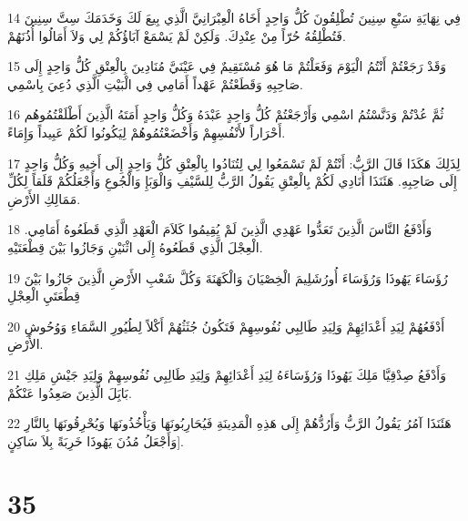 \par 14 فِي نِهَايَةِ سَبْعِ سِنِينَ تُطْلِقُونَ كُلُّ وَاحِدٍ أَخَاهُ الْعِبْرَانِيَّ الَّذِي بِيعَ لَكَ وَخَدَمَكَ سِتَّ سِنِينَ فَتُطْلِقُهُ حُرّاً مِنْ عِنْدِكَ. وَلَكِنْ لَمْ يَسْمَعْ آبَاؤُكُمْ لِي وَلاَ أَمَالُوا أُذُنَهُمْ.
\par 15 وَقَدْ رَجَعْتُمْ أَنْتُمُ الْيَوْمَ وَفَعَلْتُمْ مَا هُوَ مُسْتَقِيمٌ فِي عَيْنَيَّ مُنَادِينَ بِالْعِتْقِ كُلُّ وَاحِدٍ إِلَى صَاحِبِهِ وَقَطَعْتُمْ عَهْداً أَمَامِي فِي الْبَيْتِ الَّذِي دُعِيَ بِاسْمِي.
\par 16 ثُمَّ عُدْتُمْ وَدَنَّسْتُمُ اسْمِي وَأَرْجَعْتُمْ كُلُّ وَاحِدٍ عَبْدَهُ وَكُلُّ وَاحِدٍ أَمَتَهُ الَّذِينَ أَطْلَقْتُمُوهُم أَحْرَاراً لأَنْفُسِهِمْ وَأَخْضَعْتُمُوهُمْ لِيَكُونُوا لَكُمْ عَبِيداً وَإِمَاءً.
\par 17 لِذَلِكَ هَكَذَا قَالَ الرَّبُّ: أَنْتُمْ لَمْ تَسْمَعُوا لِي لِتُنَادُوا بِالْعِتْقِ كُلُّ وَاحِدٍ إِلَى أَخِيهِ وَكُلُّ وَاحِدٍ إِلَى صَاحِبِهِ. هَئَنَذَا أُنَادِي لَكُمْ بِالْعِتْقِ يَقُولُ الرَّبُّ لِلسَّيْفِ وَالْوَبَإِ وَالْجُوعِ وَأَجْعَلُكُمْ قَلَقاً لِكُلِّ مَمَالِكِ الأَرْضِ.
\par 18 وَأَدْفَعُ النَّاسَ الَّذِينَ تَعَدُّوا عَهْدِي الَّذِينَ لَمْ يُقِيمُوا كَلاَمَ الْعَهْدِ الَّذِي قَطَعُوهُ أَمَامِي. الْعِجْلَ الَّذِي قَطَعُوهُ إِلَى اثْنَيْنِ وَجَازُوا بَيْنَ قِطْعَتَيْهِ.
\par 19 رُؤَسَاءَ يَهُوذَا وَرُؤَسَاءَ أُورُشَلِيمَ الْخِصْيَانَ وَالْكَهَنَةَ وَكُلَّ شَعْبِ الأَرْضِ الَّذِينَ جَازُوا بَيْنَ قِطْعَتَيِ الْعِجْلِ
\par 20 أَدْفَعُهُمْ لِيَدِ أَعْدَائِهِمْ وَلِيَدِ طَالِبِي نُفُوسِهِمْ فَتَكُونُ جُثَثُهُمْ أَكْلاً لِطُيُورِ السَّمَاءِ وَوُحُوشِ الأَرْضِ.
\par 21 وَأَدْفَعُ صِدْقِيَّا مَلِكَ يَهُوذَا وَرُؤَسَاءَهُ لِيَدِ أَعْدَائِهِمْ وَلِيَدِ طَالِبِي نُفُوسِهِمْ وَلِيَدِ جَيْشِ مَلِكِ بَابَِلَ الَّذِينَ صَعِدُوا عَنْكُمْ.
\par 22 هَئَنَذَا آمُرُ يَقُولُ الرَّبُّ وَأَرُدُّهُمْ إِلَى هَذِهِ الْمَدِينَةِ فَيُحَارِبُونَهَا وَيَأْخُذُونَهَا وَيُحْرِقُونَهَا بِالنَّارِ وَأَجْعَلُ مُدُنَ يَهُوذَا خَرِبَةً بِلاَ سَاكِنٍ].

\chapter{35}

